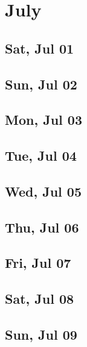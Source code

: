 \chapter{July}
	\section{Sat, Jul 01}
		
		
	\section{Sun, Jul 02}
		
		
	\section{Mon, Jul 03}
		
		
	\section{Tue, Jul 04}
		
		
	\section{Wed, Jul 05}
		
		
	\section{Thu, Jul 06}
		
		
	\section{Fri, Jul 07}
		
		
	\section{Sat, Jul 08}
		
		
	\section{Sun, Jul 09}
		
		
